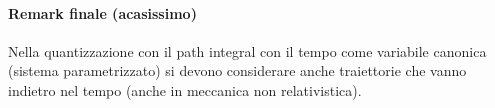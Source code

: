 \documentclass[a4paper, 11pt]{article}
\begin{document}
	\paragraph{Remark finale (acasissimo)}
	Nella quantizzazione con il path integral con il tempo come variabile canonica (sistema parametrizzato) si devono considerare anche traiettorie che vanno indietro nel tempo (anche in meccanica non relativistica).
	
	
	
	
	
	
	

	
	
	
	
	
	
	
	
	
	
	
	
	
	
	
	
	
	
	\newpage
	
\end{document}
